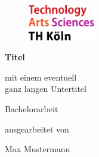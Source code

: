 \begin{titlepage}

\begin{center}

\begin{figure}[!ht]
		\includegraphics[width=0.26\textwidth]{images/THlogoheader.pdf}
\end{figure}

\vspace{0.4cm}

\begin{rmfamily}
\begin{huge}
\textbf{Titel}\\	
\end{huge}
\vspace{0.5cm}
\begin{LARGE}
mit einem eventuell\\ganz langen Untertitel\\
\end{LARGE}
\end{rmfamily}

\vspace{0.8cm}



\begin{LARGE}
\begin{scshape}
Bachelorarbeit\\[0.8em]
\end{scshape}
\end{LARGE}

\begin{large}
ausgearbeitet von\\ 
\vspace{0.3cm}
\begin{LARGE}
Max Mustermann\\
\end{LARGE}
\end{large}


\end{center}
\end{titlepage}
